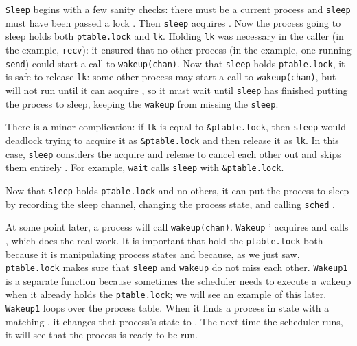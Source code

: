 \lstinline{Sleep}
begins with a few sanity checks:
there must be a current process
and
\lstinline{sleep}
must have been passed a lock
.
Then 
\lstinline{sleep}
acquires 
.
Now the process going to sleep holds both
\lstinline{ptable.lock}
and
\lstinline{lk}.
Holding
\lstinline{lk}
was necessary in the caller (in the example,
\lstinline{recv}):
it
ensured that no other process (in the example,
one running
\lstinline{send})
could start a call to
\lstinline{wakeup(chan)}.
Now that
\lstinline{sleep}
holds
\lstinline{ptable.lock},
it is safe to release
\lstinline{lk}:
some other process may start a call to
\lstinline{wakeup(chan)},
but
will not run until it can acquire
,
so it must wait until
\lstinline{sleep}
has finished putting the process to sleep,
keeping the
\lstinline{wakeup}
from missing the
\lstinline{sleep}.

There is a minor complication: if 
\lstinline{lk}
is equal to
\lstinline{&ptable.lock},
then
\lstinline{sleep}
would deadlock trying to acquire it as
\lstinline{&ptable.lock}
and then release it as
\lstinline{lk}.
In this case,
\lstinline{sleep}
considers the acquire and release
to cancel each other out
and skips them entirely
.
For example,
\lstinline{wait}
calls
\lstinline{sleep}
with 
\lstinline{&ptable.lock}.

Now that
\lstinline{sleep}
holds
\lstinline{ptable.lock}
and no others,
it can put the process to sleep by recording
the sleep channel,
changing the process state,
and calling
\lstinline{sched}
.

At some point later, a process will call
\lstinline{wakeup(chan)}.
\lstinline{Wakeup}
'
acquires
and calls
,
which does the real work.
It is important that
hold the
\lstinline{ptable.lock}
both because it is manipulating process states
and because, as we just saw,
\lstinline{ptable.lock}
makes sure that
\lstinline{sleep}
and
\lstinline{wakeup}
do not miss each other.
\lstinline{Wakeup1}
is a separate function because
sometimes the scheduler needs to
execute a wakeup when it already
holds the 
\lstinline{ptable.lock};
we will see an example of this later.
\lstinline{Wakeup1}
loops over the process table.
When it finds a process in state
with a matching
,
it changes that process's state to
.
The next time the scheduler runs, it will
see that the process is ready to be run.

